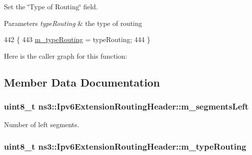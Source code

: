 Set the \char`\"{}\+Type of Routing\char`\"{} field. 


\begin{DoxyParams}{Parameters}
{\em type\+Routing} & the type of routing \\
\hline
\end{DoxyParams}

\begin{DoxyCode}
442 \{
443   \hyperlink{classns3_1_1Ipv6ExtensionRoutingHeader_a4456e7eb15bf5d03c29f753e4aedfc66}{m\_typeRouting} = typeRouting;
444 \}
\end{DoxyCode}


Here is the caller graph for this function\+:




\subsection{Member Data Documentation}
\subsubsection[{\texorpdfstring{m\+\_\+segments\+Left}{m_segmentsLeft}}]{\setlength{\rightskip}{0pt plus 5cm}uint8\+\_\+t ns3\+::\+Ipv6\+Extension\+Routing\+Header\+::m\+\_\+segments\+Left\hspace{0.3cm}{\ttfamily [private]}}\hypertarget{classns3_1_1Ipv6ExtensionRoutingHeader_acddf13eafb8d64ffef9357e0ef98193a}{}\label{classns3_1_1Ipv6ExtensionRoutingHeader_acddf13eafb8d64ffef9357e0ef98193a}


Number of left segments. 

\subsubsection[{\texorpdfstring{m\+\_\+type\+Routing}{m_typeRouting}}]{\setlength{\rightskip}{0pt plus 5cm}uint8\+\_\+t ns3\+::\+Ipv6\+Extension\+Routing\+Header\+::m\+\_\+type\+Routing\hspace{0.3cm}{\ttfamily [private]}}\hypertarget{classns3_1_1Ipv6ExtensionRoutingHeader_a4456e7eb15bf5d03c29f753e4aedfc66}{}\label{classns3_1_1Ipv6ExtensionRoutingHeader_a4456e7eb15bf5d03c29f753e4aedfc66}


